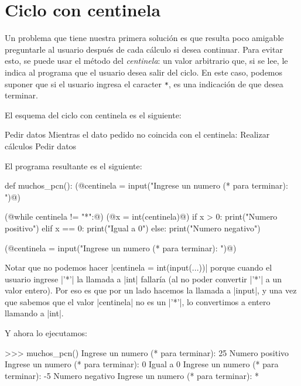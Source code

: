 \section{Ciclo con centinela}
\label{centinela}

Un problema que tiene nuestra primera solución es que resulta poco amigable
preguntarle al usuario después de cada cálculo si desea continuar. Para evitar
esto, se puede usar el método del {\it centinela}: un valor arbitrario que, si
se lee, le indica al programa que el usuario desea salir del ciclo. En este
caso, podemos suponer que si el usuario ingresa el caracter \lstinline!*!, es
una indicación de que desea terminar.

El esquema del ciclo con centinela es el siguiente:

\begin{codigo-nohl-sn}
Pedir datos
Mientras el dato pedido no coincida con el centinela:
    Realizar cálculos
    Pedir datos
\end{codigo-nohl-sn}

El programa resultante es el siguiente:

\begin{codigo-python-sn}
def muchos_pcn():
    (@centinela = input("Ingrese un numero (* para terminar): ")@)

    (@while centinela != "*":@)
        (@x = int(centinela)@)
        if x > 0:
            print("Numero positivo")
        elif x == 0:
            print("Igual a 0")
        else:
            print("Numero negativo")

        (@centinela = input("Ingrese un numero (* para terminar): ")@)
\end{codigo-python-sn}

Notar que no podemos hacer |centinela = int(input(...))| porque cuando el
usuario ingrese |'*'| la llamada a |int| fallaría (al no poder convertir |'*'|
a un valor entero). Por eso es que por un lado hacemos la llamada a |input|, y
una vez que sabemos que el valor |centinela| no es un |'*'|, lo convertimos a
entero llamando a |int|.

Y ahora lo ejecutamos:

\begin{codigo-python-sn}
>>> muchos_pcn()
Ingrese un numero (* para terminar): 25
Numero positivo
Ingrese un numero (* para terminar): 0
Igual a 0
Ingrese un numero (* para terminar): -5
Numero negativo
Ingrese un numero (* para terminar): *
\end{codigo-python-sn}

